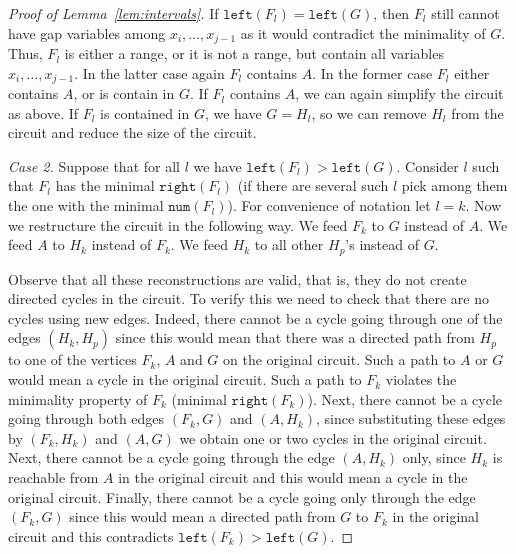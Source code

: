 \documentclass[11pt,letterpaper]{article}
\newcommand{\lef}{\texttt{left}}
\newcommand{\righ}{\texttt{right}}
\newcommand{\num}{\texttt{num}}
\begin{document}
\begin{proof}[Proof of Lemma~\ref{lem:intervals}]
If $\lef(F_l) = \lef(G)$, then $F_l$ still cannot have gap variables among $x_i, \ldots, x_{j-1}$ as it would contradict the minimality of $G$. Thus, $F_l$ is either a range, or it is not a range, but contain all variables $x_i, \ldots, x_{j-1}$. In the latter case again $F_l$ contains $A$. In the former case $F_l$ either contains $A$, or is contain in $G$. If $F_l$ contains $A$, we can again simplify the circuit as above. If $F_l$ is contained in $G$, we have $G=H_l$, so we can remove $H_l$ from the circuit and reduce the size of the circuit.

\emph{Case 2.} Suppose that for all $l$ we have $\lef(F_l)>\lef(G)$. Consider $l$ such that $F_l$ has the minimal $\righ(F_l)$ (if there are several such $l$ pick among them the one with the minimal $\num(F_l)$). For convenience of notation let $l=k$. Now we restructure the circuit in the following way. We feed $F_k$ to $G$ instead of $A$. We feed $A$ to $H_k$ instead of $F_k$. We feed $H_k$ to all other $H_p$'s instead of $G$. 

\begin{center}
\end{center}

Observe that all these reconstructions are valid, that is, they do not create directed cycles in the circuit. To verify this we need to check that there are no cycles using new edges. Indeed, there cannot be a cycle going through one of the edges $(H_k,H_p)$ since this would mean that there was a directed path from $H_p$ to one of the vertices $F_k$, $A$ and $G$ on the original circuit. Such a path to $A$ or $G$ would mean a cycle in the original circuit. Such a path to $F_k$ violates the minimality property of $F_k$ (minimal $\righ(F_k)$). Next, there cannot be a cycle going through both edges $(F_k,G)$ and $(A,H_k)$, since substituting these edges by $(F_k,H_k)$ and $(A,G)$ we obtain one or two cycles in the original circuit. Next, there cannot be a cycle going through the edge $(A,H_k)$ only, since $H_k$ is reachable from $A$ in the original circuit and this would mean a cycle in the original circuit. Finally, there cannot be a cycle going only through the edge $(F_k,G)$ since this would mean a directed path from $G$ to $F_k$ in the original circuit and this contradicts $\lef(F_k)>\lef(G)$.


\end{proof}
\end{document}
